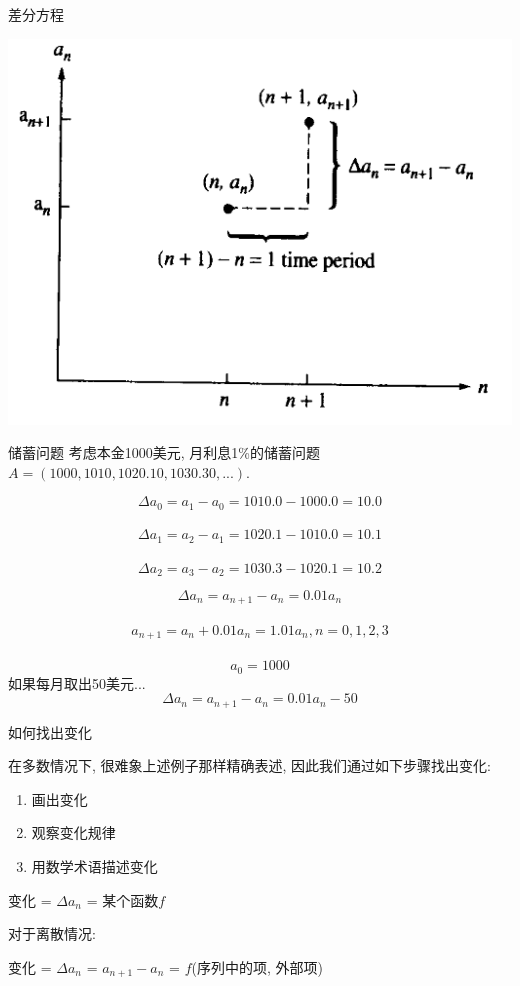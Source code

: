 \documentclass{beamer}
\begin{document}
\begin{frame}{差分方程}
  \begin{center}
    \includegraphics[width=.6\textwidth{}]{difference.png}
  \end{center}
\end{frame}

\begin{frame}{储蓄问题}
考虑本金1000美元, 月利息1\%的储蓄问题$A = (1000, 1010, 1020.10, 1030.30, ...)$.
\begin{block}{}
    \[
    \Delta a_0 = a_1 - a_0 = 1010.0 - 1000.0 = 10.0
    \]\\[-25pt]
    \[
    \Delta a_1 = a_2 - a_1 = 1020.1 - 1010.0 = 10.1
    \]\\[-25pt]
    \[
    \Delta a_2 = a_3 - a_2 = 1030.3 - 1020.1 = 10.2
    \]
\end{block}

\[
\Delta a_n = a_{n+1} - a_n = 0.01a_n
\]\\[-25pt]
\[
a_{n+1} = a_n + 0.01a_n = 1.01a_n, n = 0, 1, 2, 3
\]\\[-25pt]
\[
a_0 = 1000
\]
  如果每月取出50美元...
\[
\Delta a_n = a_{n+1} - a_n = 0.01a_n - 50
\]

\end{frame}

\begin{frame}{如何找出变化}

在多数情况下, 很难象上述例子那样精确表述, 因此我们通过如下步骤找出变化:

\begin{enumerate}
\item 画出变化
\item 观察变化规律
\item 用数学术语描述变化
\end{enumerate}

变化 = $\Delta a_n$ = 某个函数$f$

对于离散情况:

变化 = $\Delta a_n$ = $a_{n+1} - a_n$ = $f$(序列中的项, 外部项)
\end{frame}
\end{document}
